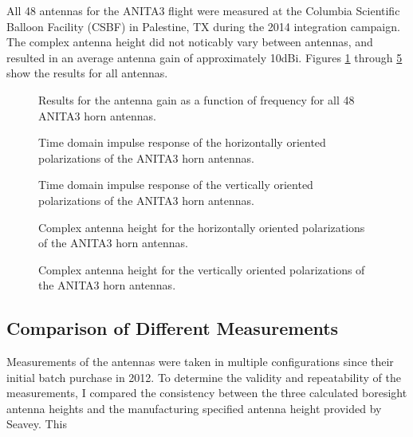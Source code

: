		All 48 antennas for the ANITA3 flight were measured at the Columbia Scientific Balloon Facility (CSBF) in Palestine, TX during the 2014 integration campaign.  The complex antenna height did not noticably vary between antennas, and resulted in an average antenna gain of approximately 10dBi.  Figures \ref{fig:antennaGain} through \ref{fig:antResponse_fftV} show the results for all antennas.
		

\begin{figure}
\centering
{}
	\caption{Results for the antenna gain as a function of frequency for all 48 ANITA3 horn antennas.}
\label{fig:antennaGain}
\end{figure}

\begin{figure}
\centering
{}
	\caption{Time domain impulse response of the horizontally oriented polarizations of the ANITA3 horn antennas.}
\label{fig:antResponse_timeH}
\end{figure}

\begin{figure}
\centering
{}
	\caption{Time domain impulse response of the vertically oriented polarizations of the ANITA3 horn antennas.}
\label{fig:antResponse_timeV}
\end{figure}

\begin{figure}
\centering
{}
	\caption{Complex antenna height for the horizontally oriented polarizations of the ANITA3 horn antennas.}
\label{fig:antResponse_fftH}
\end{figure}

\begin{figure}
\centering
{}
	\caption{Complex antenna height for the vertically oriented polarizations of the ANITA3 horn antennas.}
\label{fig:antResponse_fftV}
\end{figure}


	\subsection{Comparison of Different Measurements}
	 	Measurements of the antennas were taken in multiple configurations since their initial batch purchase in 2012.  To determine the validity and repeatability of the measurements, I compared the consistency between the three calculated boresight antenna heights and the manufacturing specified antenna height provided by Seavey.  This 


